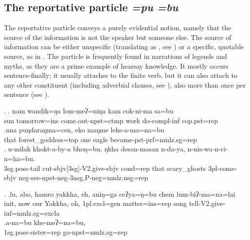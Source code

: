 \subsection{The reportative particle \emph{=pu \ti =bu}}\label{hearsay}
 
The reportative particle conveys a purely evidential notion, namely that the source of the information is not the speaker but someone else. The source of information can be either unspecific (translating as , see \Next) or a specific, quotable source, as in \NNext. The particle is frequently found in narrations of legends and myths, as they are a prime example of hearsay know\-ledge. It mostly occurs sentence-finally; it usually attaches to the finite verb, but it can also attach to any other constituent (including adverbial clauses, see \Next[c]), also more than once per sentence (see \NNext[b]). 
 
 \ex. \ag. nam wandik=ŋa       lom-meʔ=niŋa                kam  cok-ni-ma           sa=bu\\
 sun tomorrow{\sc =ins} come.out{\sc [3sg]-npst=ctmp} work do{\sc -compl-inf} {\sc cop.pst=rep}\\
 \bg.nna  puŋdaraŋma=cen,     eko maŋme leks-a-ma=na=bu\\
that forest\_goddess{\sc =top} one eagle become{\sc [3sg]-pst-prf=nmlz.sg=rep}\\
\bg. u-milak          khokt-a-by-a                                bhoŋ=bu,    ŋkha desan-masan  n-da-ya,            n-nis-wa-n-ci-n=ha=bu.\\
{\sc 3sg.poss-}tail  cut{\sc -sbjv[3sg]-V2.give-sbjv} {\sc cond=rep}  that  scary\_ghosts {\sc 3pl-}come{\sc -sbjv} {\sc neg-}see{\sc -npst-neg-3nsg.P-neg=nmlz.nsg=rep}\\
 

 \ex. \ag.\label{lu}lu,   abo, hamro yakkha,    eh, aniŋ=ga  ceʔya=ŋ=bu chem lum-biʔ-ma=na=lai\\
 {\sc init}, now our Yakkha, oh, {\sc 1pl.excl=gen} matter{\sc =ins=rep} song tell{\sc -V2.give-inf=nmlz.sg=excla}\\
 \bg.a-na=bu      khe-meʔ=na=bu,      \\
{\sc 1sg.poss-}sister{\sc =rep} go{\sc [3sg]-npst=nmlz.sg=rep}\\
  
 
